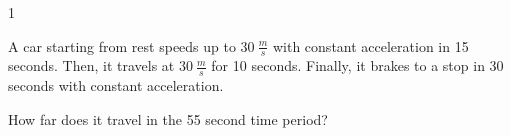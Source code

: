 
\AddToShipoutPicture*{\BackgroundPic}

\addtocounter {ProbNum} {1}

 
{\bf \Large{}} A car starting from rest speeds up to ${30~\frac{m}{s}}$ with constant acceleration in 15 seconds. Then, it travels at ${30~\frac{m}{s}}$ for 10 seconds. Finally, it brakes to a stop in 30 seconds with constant acceleration. 

 \bigskip

\indent How far does it travel in the 55 second time period?  
 

\vfill

\newpage
